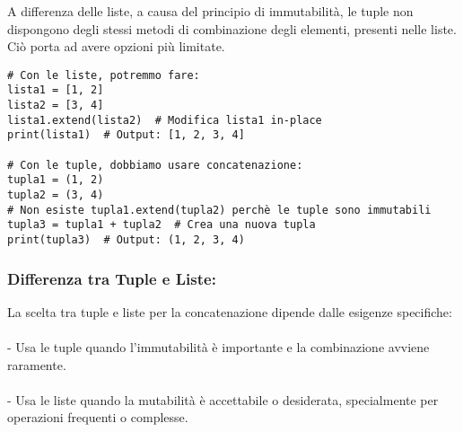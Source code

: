 A differenza delle liste, a causa del principio di immutabilità, le tuple non dispongono degli stessi metodi di combinazione degli elementi, presenti nelle liste. Ciò porta ad avere opzioni più limitate.

\begin{lstlisting}
# Con le liste, potremmo fare:
lista1 = [1, 2]
lista2 = [3, 4]
lista1.extend(lista2)  # Modifica lista1 in-place
print(lista1)  # Output: [1, 2, 3, 4]

# Con le tuple, dobbiamo usare concatenazione:
tupla1 = (1, 2)
tupla2 = (3, 4)
# Non esiste tupla1.extend(tupla2) perchè le tuple sono immutabili
tupla3 = tupla1 + tupla2  # Crea una nuova tupla
print(tupla3)  # Output: (1, 2, 3, 4)
\end{lstlisting}

\subsubsection{{Differenza tra Tuple e Liste:}}\label{DifferenzaListeTuple}

La scelta tra tuple e liste per la concatenazione dipende dalle esigenze specifiche:
\\ \\
- Usa le tuple quando l'immutabilità è importante e la combinazione avviene raramente.\\ \\
- Usa le liste quando la mutabilità è accettabile o desiderata, specialmente per operazioni frequenti o complesse.

